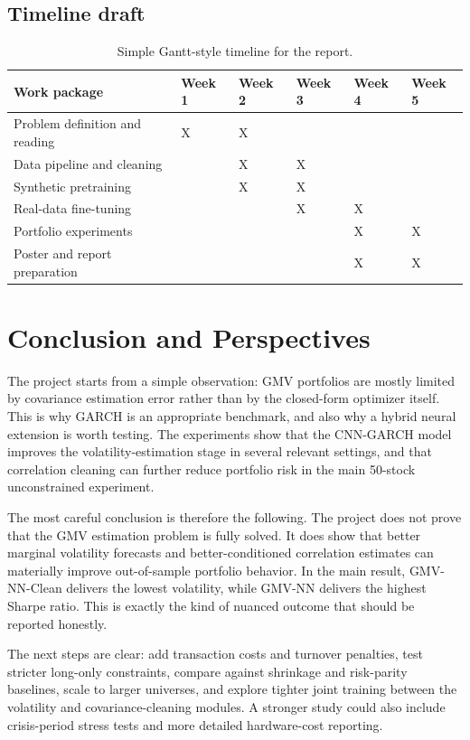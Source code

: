 \documentclass[11pt,a4paper]{article}
\begin{document}
\subsection{Timeline draft}

\begin{table}[H]
\centering
\caption{Simple Gantt-style timeline for the report.}
\label{tab:timeline}
\begin{tabularx}{\textwidth}{lXXXXX}
\toprule
Work package & Week 1 & Week 2 & Week 3 & Week 4 & Week 5 \\
\midrule
Problem definition and reading & X & X &  &  &  \\
Data pipeline and cleaning &  & X & X &  &  \\
Synthetic pretraining &  & X & X &  &  \\
Real-data fine-tuning &  &  & X & X &  \\
Portfolio experiments &  &  &  & X & X \\
Poster and report preparation &  &  &  & X & X \\
\bottomrule
\end{tabularx}
\end{table}

\section{Conclusion and Perspectives}

The project starts from a simple observation: GMV portfolios are mostly limited by covariance estimation error rather than by the closed-form optimizer itself. This is why GARCH is an appropriate benchmark, and also why a hybrid neural extension is worth testing. The experiments show that the CNN-GARCH model improves the volatility-estimation stage in several relevant settings, and that correlation cleaning can further reduce portfolio risk in the main 50-stock unconstrained experiment.

The most careful conclusion is therefore the following. The project does not prove that the GMV estimation problem is fully solved. It does show that better marginal volatility forecasts and better-conditioned correlation estimates can materially improve out-of-sample portfolio behavior. In the main result, GMV-NN-Clean delivers the lowest volatility, while GMV-NN delivers the highest Sharpe ratio. This is exactly the kind of nuanced outcome that should be reported honestly.

The next steps are clear: add transaction costs and turnover penalties, test stricter long-only constraints, compare against shrinkage and risk-parity baselines, scale to larger universes, and explore tighter joint training between the volatility and covariance-cleaning modules. A stronger study could also include crisis-period stress tests and more detailed hardware-cost reporting.
\end{document}

